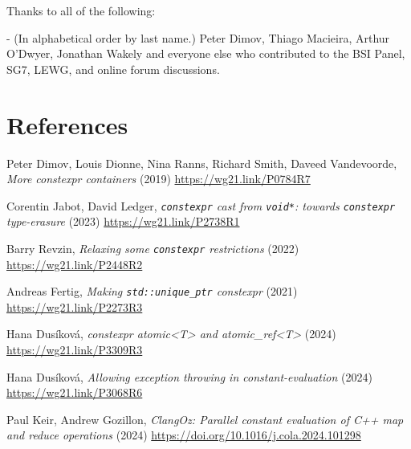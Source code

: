 \documentclass[10pt]{article}
\begin{document}
Thanks to all of the following:

  - (In alphabetical order by last name.) Peter Dimov, Thiago Macieira, Arthur O'Dwyer, Jonathan Wakely and everyone else who contributed to the BSI Panel, SG7, LEWG, and online forum discussions.

\section{References}
\renewcommand{\section}[2]{}%
\begin{thebibliography}{9}

    Peter Dimov, Louis Dionne, Nina Ranns, Richard Smith, Daveed Vandevoorde,
    \emph{More constexpr containers} (2019)\newline
    \url{https://wg21.link/P0784R7}

    Corentin Jabot, David Ledger,
    \emph{\texttt{constexpr} cast from \texttt{void*}: towards \texttt{constexpr} type-erasure} (2023)\newline
    \url{https://wg21.link/P2738R1}

    Barry Revzin,
    \emph{Relaxing some \texttt{constexpr} restrictions} (2022)\newline
    \url{https://wg21.link/P2448R2}

    Andreas Fertig,
    \emph{Making \texttt{std::unique\_ptr} constexpr} (2021)\newline
    \url{https://wg21.link/P2273R3}

    Hana Dusíková,
    \emph{constexpr atomic<T> and atomic\_ref<T>} (2024)\newline
    \url{https://wg21.link/P3309R3}

    Hana Dusíková,
    \emph{Allowing exception throwing in constant-evaluation} (2024)\newline
    \url{https://wg21.link/P3068R6}

    Paul Keir, Andrew Gozillon,
    \emph{ClangOz: Parallel constant evaluation of C++ map and reduce operations} (2024)\newline
    \url{https://doi.org/10.1016/j.cola.2024.101298}

\end{thebibliography}
\end{document}
